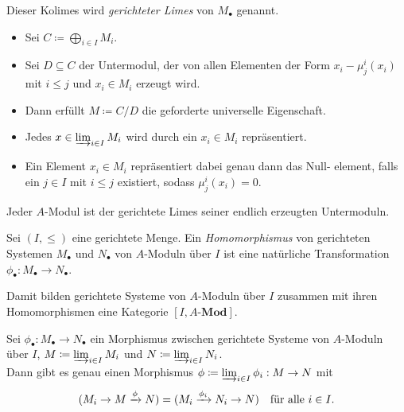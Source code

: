 \documentclass{cheat-sheet}
\newcommand{\Mod}{\mathbf{Mod}} %
\newcommand{\LMod}[1]{{#1}\text{-}\Mod} %
\begin{document}
\begin{defn}
  Dieser Kolimes wird \emph{gerichteter Limes} von $M_\bullet$ genannt.
\end{defn}

\begin{konstr}
  \begin{itemize}
    \item Sei $C \coloneqq \bigoplus_{i \in I} M_i$.
    \item Sei $D \subseteq C$ der Untermodul, der von allen Elementen der Form $x_i - \mu^i_j(x_i)$ mit $i \leq j$ und $x_i \in M_i$ erzeugt wird.
    \item Dann erfüllt $M \coloneqq C/D$ die geforderte universelle Eigenschaft.
  \end{itemize}
\end{konstr}


\begin{bem}
  \begin{itemize}
    \item Jedes $x \in \varinjlim_{i \in I} M_i$ wird durch ein $x_i \in M_i$ repräsentiert.
    \item Ein Element $x_i \in M_i$ repräsentiert dabei genau dann das Null- element, falls ein $j \in I$ mit $i \leq j$ existiert, sodass $\mu^i_j(x_i) = 0$.
  \end{itemize}
\end{bem}

\begin{lem}
  Jeder $A$-Modul ist der gerichtete Limes seiner endlich erzeugten Untermoduln.
\end{lem}


\begin{defn}
  Sei $(I, \leq)$ eine gerichtete Menge.
  Ein \textit{Homomorphismus} von gerichteten Systemen $M_\bullet$ und $N_\bullet$ von $A$-Moduln über $I$ ist eine natürliche Transformation $\phi_\bullet : M_\bullet \to N_\bullet$.
\end{defn}

\begin{bem}
  Damit bilden gerichtete Systeme von $A$-Moduln über $I$ zusammen mit ihren Homomorphismen eine Kategorie $[I, \LMod{A}]$.
\end{bem}

\begin{prop}
  Sei $\phi_\bullet : M_\bullet \to N_\bullet$ ein Morphismus zwischen gerichtete Systeme von $A$-Moduln über $I$, $M \coloneqq \varinjlim_{i \in I} M_i$ und $N \coloneqq \varinjlim_{i \in I} N_i$. \\
  Dann gibt es genau einen Morphismus $\phi \coloneqq \varinjlim_{i \in I} \phi_i : M \to N$ mit
  \[
    (M_i \to M \xrightarrow{\phi} N) = (M_i \xrightarrow{\phi_i} N_i \to N) \quad
    \text{für alle } i \in I.
  \]
\end{prop}
\end{document}
